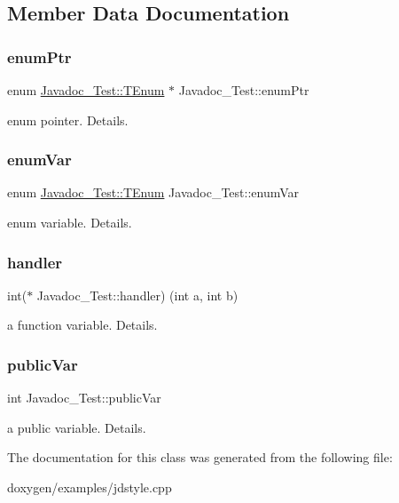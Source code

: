 \subsection{Member Data Documentation}
\mbox{\label{class_javadoc___test_abcb36df9d8af3e69290c239ba483d6df}} 
\subsubsection{\texorpdfstring{enumPtr}{enumPtr}}
{\footnotesize\ttfamily enum \mbox{\hyperlink{class_javadoc___test_ae37fd1cbf1af522674cbd33873b786a6}{Javadoc\+\_\+\+Test\+::\+T\+Enum}} 
       $\ast$ Javadoc\+\_\+\+Test\+::enum\+Ptr}

enum pointer. Details. \mbox{\label{class_javadoc___test_a689558649150237b53a5c8ed89c996c2}} 
\subsubsection{\texorpdfstring{enumVar}{enumVar}}
{\footnotesize\ttfamily enum \mbox{\hyperlink{class_javadoc___test_ae37fd1cbf1af522674cbd33873b786a6}{Javadoc\+\_\+\+Test\+::\+T\+Enum}}
        Javadoc\+\_\+\+Test\+::enum\+Var}

enum variable. Details. \mbox{\label{class_javadoc___test_ace81a523a4eef44501a841a6d338832b}} 
\subsubsection{\texorpdfstring{handler}{handler}}
{\footnotesize\ttfamily int($\ast$ Javadoc\+\_\+\+Test\+::handler) (int a, int b)}

a function variable. Details. \mbox{\label{class_javadoc___test_a44a516fbc3a4865e2dcae34649c9df6a}} 
\subsubsection{\texorpdfstring{publicVar}{publicVar}}
{\footnotesize\ttfamily int Javadoc\+\_\+\+Test\+::public\+Var}

a public variable. Details. 

The documentation for this class was generated from the following file\+:\begin{DoxyCompactItemize}
\item 
doxygen/examples/jdstyle.\+cpp\end{DoxyCompactItemize}
